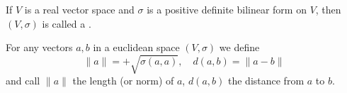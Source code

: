 If $V$ is a real vector space and $\sigma$ is a positive definite bilinear form on $V$, then $(V, \sigma)$ is called a .

For any vectors $a, b$ in a euclidean space $(V, \sigma)$ we define
$$\|a\| = +\sqrt{\sigma(a, a)}, \quad d(a, b) = \|a - b\|$$
and call $\|a\|$ the length (or norm) of $a$, $d(a, b)$ the distance from $a$ to $b$.
